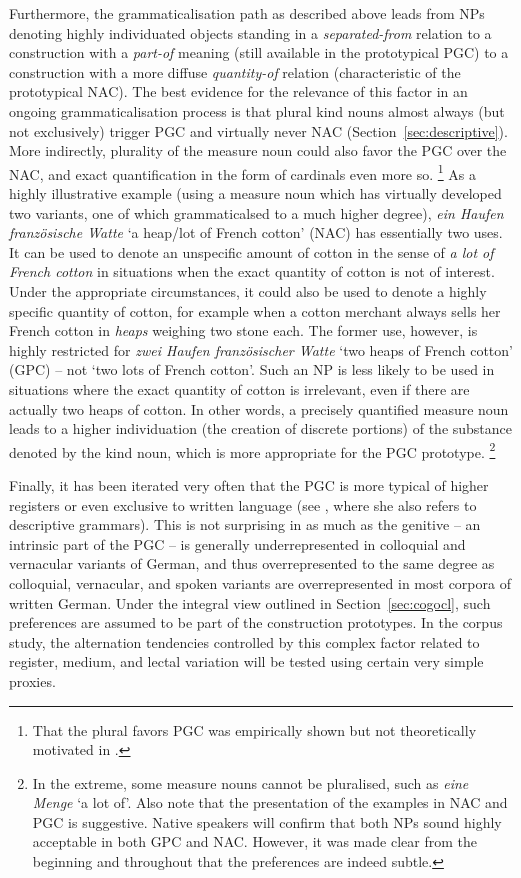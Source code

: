 \documentclass[USenglish]{article}
\begin{document}
Furthermore, the grammaticalisation path as described above leads from NPs denoting highly individuated objects standing in a \textit{separated-from} relation to a construction with a \textit{part-of} meaning (still available in the prototypical PGC) to a construction with a more diffuse \textit{quantity-of} relation (characteristic of the prototypical NAC).
The best evidence for the relevance of this factor in an ongoing grammaticalisation process is that plural kind nouns almost always (but not exclusively) trigger PGC and virtually never NAC (Section~\ref{sec:descriptive}).
More indirectly, plurality of the measure noun could also favor the PGC over the NAC, and exact quantification in the form of cardinals even more so.%
\footnote{That the plural favors PGC was empirically shown but not theoretically motivated in \cite{Hentschel1993}.}
As a highly illustrative example (using a measure noun which has virtually developed two variants, one of which grammaticalsed to a much higher degree), \textit{ein Haufen französische Watte} `a heap\slash lot of French cotton' (NAC) has essentially two uses.
It can be used to denote an unspecific amount of cotton in the sense of \textit{a lot of French cotton} in situations when the exact quantity of cotton is not of interest.
Under the appropriate circumstances, it could also be used to denote a highly specific quantity of cotton, for example when a cotton merchant always sells her French cotton in \textit{heaps} weighing two stone each.
The former use, however, is highly restricted for \textit{zwei Haufen französischer Watte} `two heaps of French cotton' (GPC) -- not `two lots of French cotton'.
Such an NP is less likely to be used in situations where the exact quantity of cotton is irrelevant, even if there are actually two heaps of cotton.
In other words, a precisely quantified measure noun leads to a higher individuation (the creation of discrete portions) of the substance denoted by the kind noun, which is more appropriate for the PGC prototype.%
\footnote{In the extreme, some measure nouns cannot be pluralised, such as \textit{eine Menge} `a lot of'.
Also note that the presentation of the examples in NAC and PGC is suggestive.
Native speakers will confirm that both NPs sound highly acceptable in both GPC and NAC.
However, it was made clear from the beginning and throughout that the preferences are indeed subtle.}

Finally, it has been iterated very often that the PGC is more typical of higher registers or even exclusive to written language (see \citealp[320--323]{Hentschel1993}, where she also refers to descriptive grammars).
This is not surprising in as much as the genitive -- an intrinsic part of the PGC -- is generally underrepresented in colloquial and vernacular variants of German, and thus overrepresented to the same degree as colloquial, vernacular, and spoken variants are overrepresented in most corpora of written German.
Under the integral view outlined in Section~\ref{sec:cogocl}, such preferences are assumed to be part of the construction prototypes.
In the corpus study, the alternation tendencies controlled by this complex factor related to register, medium, and lectal variation will be tested using certain very simple proxies.
\end{document}
